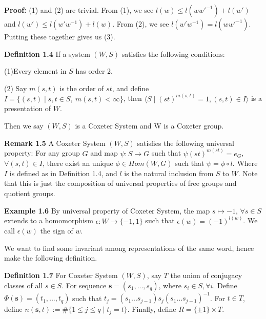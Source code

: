 \vspace{0.5\baselineskip}
\noindent\textbf{Proof:}
    (1) and (2) are trivial. From (1), we see $l(w) \le l(ww'^{-1})+l(w')$ and $l(w') \le l(w'w^{-1})+l(w)$. From (2), we see $l(w'w^{-1})=l(ww'^{-1})$. Putting these together gives us (3).

\vspace{\baselineskip}

\noindent\textbf{Definition 1.4}
    If a system $(W,S)$ satisfies the following conditions:

\indent (1)Every element in $S$ has order 2.

\indent (2) Say $m(s,t)$ is the order of $st$, and define $I = \{ (s,t) \mid s,t \in S,\ m(s,t) < \infty \}$, then $\langle S \mid (st)^{m(s,t)}=1,(s,t)\in I \rangle$ is a presentation of $W$.

Then we say $(W,S)$ is a Coxeter System and W is a Coxeter group.
\vspace{\baselineskip}


\noindent\textbf{Remark 1.5}
    A Coxeter System $(W,S)$ satisfies the following universal property: For any group $G$ and map $\psi:S \rightarrow G$ such that $\psi(st) ^{m(st)}=e_G$,$\forall(s,t) \in I$, there exist an unique $\phi \in Hom(W,G)$ such that $\psi=\phi \circ l$. Where $I$ is defined as in Definition 1.4, and $l$ is the natural inclusion from $S$ to $W$. Note that this is just the composition of universal properties of free groups and quotient groups.

\vspace{\baselineskip}

\noindent\textbf{Example 1.6}
    By universal property of Coxeter System, the map $s \mapsto -1$, $\forall s \in S$ extends to a homomorphism $\epsilon :W \rightarrow \{-1,1\}$ such that $\epsilon(w)=(-1)^{l(w)}$. We call $\epsilon(w)$ the sign of $w$. 

\vspace{\baselineskip}

We want to find some invariant among representations of the same word, hence make the following definition.
\vspace{\baselineskip}

\noindent \textbf{Definition 1.7}
    For Coxeter System $(W,S)$, say $T$ the union of conjugacy classes of all $s \in S$. For sequence $\mathbf{s}=(s_1,...,s_q)$, where $s_i \in S,\forall i$. Define $\Phi(\mathbf{s})=(t_1,...,t_q)$ such that $t_j=(s_1...s_{j-1})s_j(s_1...s_{j-1})^{-1}$. For $t\in T$, define $n(\mathbf{s},t):= \# \{1\le j \le q \mid t_j=t\}$. Finally, define $R=\{\pm 1\} \times T$.
\vspace{\baselineskip}

